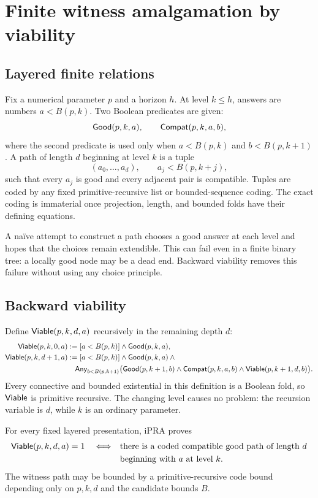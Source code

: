 \section{Finite witness amalgamation by viability}
\label{sec:amalgamation}

\subsection{Layered finite relations}

Fix a numerical parameter \(p\) and a horizon \(h\).  At level \(k\le h\),
answers are numbers \(a<B(p,k)\).  Two Boolean predicates are given:
\[
 \mathsf{Good}(p,k,a),\qquad
 \mathsf{Compat}(p,k,a,b),
\]
where the second predicate is used only when
\(a<B(p,k)\) and \(b<B(p,k+1)\).  A path of length \(d\) beginning at level
\(k\) is a tuple
\[
 (a_0,\ldots,a_d),
 \qquad a_j<B(p,k+j),
\]
such that every \(a_j\) is good and every adjacent pair is compatible.
Tuples are coded by any fixed primitive-recursive list or bounded-sequence
coding.  The exact coding is immaterial once projection, length, and bounded
folds have their defining equations.

A na\"ive attempt to construct a path chooses a good answer at each level and
hopes that the choices remain extendible.  This can fail even in a finite
binary tree: a locally good node may be a dead end.  Backward viability removes
this failure without using any choice principle.

\subsection{Backward viability}

Define \(\mathsf{Viable}(p,k,d,a)\) recursively in the remaining depth \(d\):
\begin{align*}
 \mathsf{Viable}(p,k,0,a)
   &:= [a<B(p,k)]\wedge \mathsf{Good}(p,k,a),\\
 \mathsf{Viable}(p,k,d+1,a)
   &:= [a<B(p,k)]\wedge \mathsf{Good}(p,k,a)\wedge{}\\
   &\quad \mathsf{Any}_{b<B(p,k+1)}
      \bigl(\mathsf{Good}(p,k+1,b)\wedge
             \mathsf{Compat}(p,k,a,b)\wedge
             \mathsf{Viable}(p,k+1,d,b)\bigr).
\end{align*}
Every connective and bounded existential in this definition is a Boolean fold,
so \(\mathsf{Viable}\) is primitive recursive.  The changing level causes no problem:
the recursion variable is \(d\), while \(k\) is an ordinary parameter.

\begin{theorem}
\label{thm:path-viability}
For every fixed layered presentation, iPRA proves
\begin{align*}
 \mathsf{Viable}(p,k,d,a)=1
 \quad\Longleftrightarrow\quad&
 \text{there is a coded compatible good path of length }d\\
 &\text{beginning with }a\text{ at level }k.
\end{align*}
The witness path may be bounded by a primitive-recursive code bound depending
only on \(p,k,d\) and the candidate bounds \(B\).
\end{theorem}

